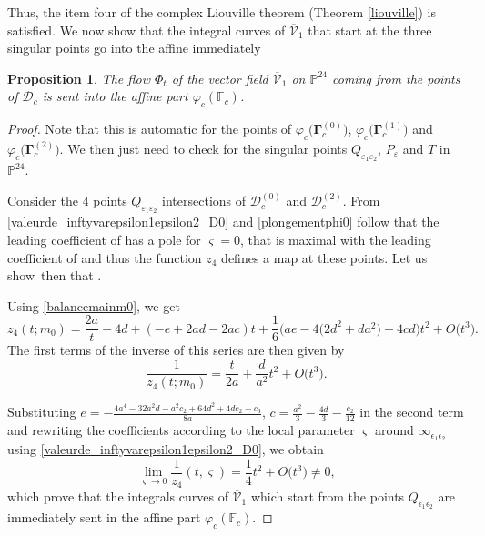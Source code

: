 \documentclass[10pt,a4paper]{amsart}
\numberwithin{equation}{section}
\newtheorem{Proposition}[Theorem]{Proposition}
 { \theoremstyle{definition}
\newtheorem{Definition}[Theorem]{Definition}
\newtheorem{Note}[Theorem]{Note}
\newtheorem{Example}[Theorem]{Example}
\newtheorem{Remark}[Theorem]{Remark} }
\begin{document}
Thus, the item four of the complex Liouville theorem (Theorem
\eqref{liouville}) is satisfied. We now show that the integral
curves of $\overline{\mathcal{V}}_1$ that start at the three
singular points go into the affine immediately
\begin{Proposition}
 The flow $\Phi_t$ of the vector field $\overline{\mathcal{V}}_1$ on $\mathbb{P}^{24}$ coming from the points of $\mathcal{D}_c$ is sent into the affine part $\varphi_c(\mathbb{F}_c)$.
\end{Proposition}
\begin{proof}
Note that this is automatic for the points of $\varphi_c\bigl(\mathbf{\Gamma}_c^{(0)}\bigr)$, $\varphi_c\bigl(\mathbf{\Gamma}_c^{ (1)}\bigr)$ and $\varphi_c\bigl(\mathbf{\Gamma}_c^{(2)}\bigr)$. We then just need to check for the singular points $Q_{\varepsilon_1\varepsilon_2}$, $P_{\varepsilon}$ and $T$ in $\mathbb{P}^{24}$.

 Consider the $4$ points $Q_{\varepsilon_1\varepsilon_2}$
intersections of $\mathcal{D}_c^{(0)}$ and
$\mathcal{D}_c^{(2)}$. From
\eqref{valeurde_inftyvarepsilon1epsilon2_D0} and
\eqref{plongementphi0} follow that the leading coefficient of
 has a pole
for $\varsigma=0$, that is maximal with the leading coefficient of
 and thus the
function $z_4$ defines a map at these points.
 Let us show~then that .

 Using \eqref{balancemainm0}, we get
 \[
 z_4(t;m_0)=\frac{2a}{t}-4d+(-e+2ad-2ac)t+\frac{1}{6}\bigl(ae-4\bigl(2d^2+da^2\bigr)+4cd\bigr)t^2+O\bigl(t^3\bigr).
 \]
 The first terms of the inverse of this series are then
 given by
\begin{equation}\label{inverse4}
 \frac{1}{z_4(t;m_0)}=\frac{t}{2a}+\frac{d}{a^2}t^2+O\bigl(t^3\bigr).
\end{equation}

Substituting
$e=-\frac{4a^4-32a^2d-a^2c_2+64d^2+4dc_2+c_3}{8a}$, $c=\frac{a^2}{3}-\frac{4d
}{3}-\frac{c_2}{12}$ in the second term and rewriting the
coefficients according to the local parameter $\varsigma$ around
$\infty_{\epsilon_1\epsilon_2}$ using
\eqref{valeurde_inftyvarepsilon1epsilon2_D0}, we obtain
\[\lim \limits_{\varsigma\rightarrow
 0}\frac{1}{z_4}(t,\varsigma)=\frac{1}{4}t^2+O\bigl(t^3\bigr)\neq0,\]
 which prove that the integrals curves of
 $\overline{\mathcal{V}}_1$ which start from the points $Q_{\epsilon_1\epsilon_2}$
 are immediately sent in the affine part $\varphi_c(\mathbb{F}_c)$.


\end{proof}
\end{document}

